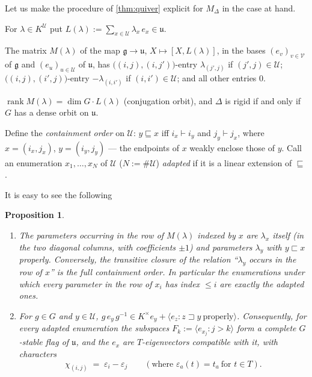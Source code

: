 \documentclass[12pt]{article}
\newtheorem{proposition}[theorem]{Proposition}
\newcommand{\Lieg}{\mathfrak{g}}
\newcommand{\uu}{\mathfrak{u}}
\newcommand{\U}{\mathcal{U}}
\newcommand{\V}{\mathcal{V}}
\newcommand{\rk}{\operatorname{rank}}
\newcommand{\IM}{\Delta}
\newcommand{\homr}{\vdash}
\begin{document}
Let us make the procedure of \cref{thm:quiver} explicit for $M_{\IM}$ in the case at hand.



For $\lambda\in K^{\U}$ put $L(\lambda):=\sum_{x\in\U}\lambda_x\,e_x\in\uu$.

The matrix $M(\lambda)$ of the map $\Lieg\to\uu$, $X\mapsto[X,L(\lambda)]$, in the
bases $(e_v)_{v\in\V}$ of $\Lieg$ and $(e_u)_{u\in\U}$ of $\uu$,
has $\bigl((i,j),(i,j')\bigr)$-entry $\lambda_{(j',j)}$ if $(j',j)\in\U$;
$\bigl((i,j),(i',j)\bigr)$-entry $-\lambda_{(i,i')}$ if
$(i,i')\in\U$; and all other entries $0$.


$\rk M(\lambda)=\dim G\cdot L(\lambda)$ (conjugation orbit), and $\IM$
is rigid if and only if $G$ has a dense orbit on $\uu$.


Define the \emph{containment order} on $\U$:
$y\sqsubseteq x$ iff $i_x\homr i_y$ and $j_y\homr j_x$, where
$x=(i_x,j_x)$, $y=(i_y,j_y)$ --- the endpoints of $x$ weakly enclose
those of $y$.  Call an enumeration $x_1,\dots,x_N$ of $\U$
($N:=\#\U$) \emph{adapted} if it is a linear extension of
$\sqsubseteq$.

It is easy to see the following
\begin{proposition}\label{prop:adapted}
\begin{enumerate}
\item The parameters occurring in the row of $M(\lambda)$
indexed by $x$ are $\lambda_x$ itself (in the two diagonal columns,
with coefficients $\pm1$) and parameters $\lambda_y$ with
$y\sqsubset x$ properly.  Conversely, the transitive closure of the
relation ``$\lambda_y$ occurs in the row of $x$'' is the full
containment order.  In particular the enumerations under which every
parameter in the row of $x_i$ has index $\le i$ are exactly the
adapted ones.
\item For $g\in G$ and $y\in\U$,
$g\,e_y\,g^{-1}\in K^\times e_y+
\langle e_z:z\sqsupset y\ \text{properly}\rangle$.  Consequently,
for every adapted enumeration the subspaces
$F_k:=\langle e_{x_j}:j>k\rangle$ form a complete $G$-stable flag of
$\uu$, and the $e_x$ are $T$-eigenvectors compatible with it, with
characters
\[
\chi_{(i,j)}\;=\;\varepsilon_i-\varepsilon_j
\qquad(\text{where }\varepsilon_a(t)=t_a\ \text{for }t\in T).
\]
\end{enumerate}
\end{proposition}
\end{document}
